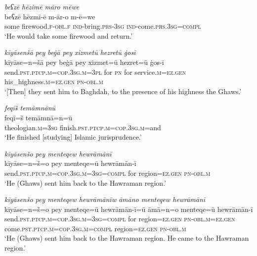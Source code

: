 \ea \label{ZP.13}
\textit{beʕzē hēzimē māro mēwe} \\ 
\gll beʕzē hēzmī-ē m-ār-o m-ē=we \\ 
 some firewood\textsc{.f}\textsc{-obl}\textsc{.f} \textsc{ind-}bring\textsc{.prs}\textsc{-3sg} \textsc{ind-}come\textsc{.prs}\textsc{.3sg}\textsc{=compl} \\ 
\glt `He would take some firewood and return.'
\z 
 
\ea \label{ZP.14}
\textit{kīyāsenšā pey beġā pey xizmetū hezretū ġosī} \\ 
\gll kīyāse=n=šā pey beġā pey xizmet=ū hezret=ū ġos-ī \\ 
 send\textsc{.pst}\textsc{.ptcp}\textsc{.m}\textsc{=cop}\textsc{.3sg}\textsc{.m}\textsc{=3pl} for \textsc{pn} for service\textsc{.m}\textsc{\textsc{=ez.gen}} his\_highness\textsc{.m}\textsc{\textsc{=ez.gen}} \textsc{pn}\textsc{-obl}\textsc{.m} \\ 
\glt `[Then] they sent him to Baghdah, to the presence of his highness the Ghaws.'
\z 
 
\ea \label{ZP.16}
\textit{feqīš temāmnānū} \\ 
\gll feqī=š temāmnā=n=ū \\ 
 theologian\textsc{.m}\textsc{=3sg} finish\textsc{.pst}\textsc{.ptcp}\textsc{.m}\textsc{=cop}\textsc{.3sg}\textsc{.m}=and \\ 
\glt `He finished [studying] Islamic jurisprudence.'
\z 
 
\ea \label{ZP.20}
\textit{kīyāsenšo pey menteqew hewrāmānī} \\ 
\gll kīyāse=n=š=o pey menteqe=ū hewrāmān-ī \\ 
 send\textsc{.pst}\textsc{.ptcp}\textsc{.m}\textsc{=cop}\textsc{.3sg}\textsc{.m}\textsc{=3sg}\textsc{=compl} for region\textsc{\textsc{=ez.gen}} \textsc{pn}\textsc{-obl}\textsc{.m} \\ 
\glt `He (Ghaws) sent him back to the Hawraman region.'
\z 
 
\ea \label{ZP.21}
\textit{kīyāsenšo pey menteqew hewrāmānīw āmāno menteqew hewrāmānī} \\ 
\gll kīyāse=n=š=o pey menteqe=ū hewrāmān-ī=ū āmā=n=o menteqe=ū hewrāmān-ī \\ 
 send\textsc{.pst}\textsc{.ptcp}\textsc{.m}\textsc{=cop}\textsc{.3sg}\textsc{.m}\textsc{=3sg}\textsc{=compl} for region\textsc{\textsc{=ez.gen}} \textsc{pn}\textsc{-obl}\textsc{.m}\textsc{\textsc{=ez.gen}} come\textsc{.pst}\textsc{.ptcp}\textsc{.m}\textsc{=cop}\textsc{.3sg}\textsc{.m}\textsc{=compl} region\textsc{\textsc{=ez.gen}} \textsc{pn}\textsc{-obl}\textsc{.m} \\ 
\glt `He (Ghaws) sent him back to the Hawraman region. He came to the Hawraman region.'
\z 
 
